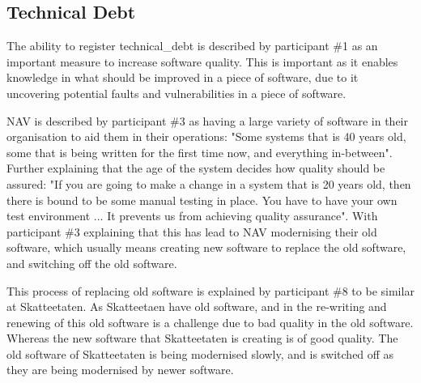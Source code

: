 \subsection{Technical Debt}
The ability to register \gls{technical_debt} is described by participant \#1 as an important measure to increase software quality. This is important as it enables knowledge in what should be improved in a piece of software, due to it uncovering potential faults and vulnerabilities in a piece of software.


NAV is described by participant \#3 as having a large variety of software in their organisation to aid them in their operations: "Some systems that is 40 years old, some that is being written for the first time now, and everything in-between". Further explaining that the age of the system decides how quality should be assured: "If you are going to make a change in a system that is 20 years old, then there is bound to be some manual testing in place. You have to have your own test environment ... It prevents us from achieving quality assurance". With participant \#3 explaining that this has lead to NAV modernising their old software, which usually means creating new software to replace the old software, and switching off the old software.


This process of replacing old software is explained by participant \#8 to be similar at Skatteetaten. As Skatteetaen have old software, and in the re-writing and renewing of this old software is a challenge due to bad quality in the old software. Whereas the new software that Skatteetaten is creating is of good quality. The old software of Skatteetaten is being modernised slowly, and is switched off as they are being modernised by newer software.

